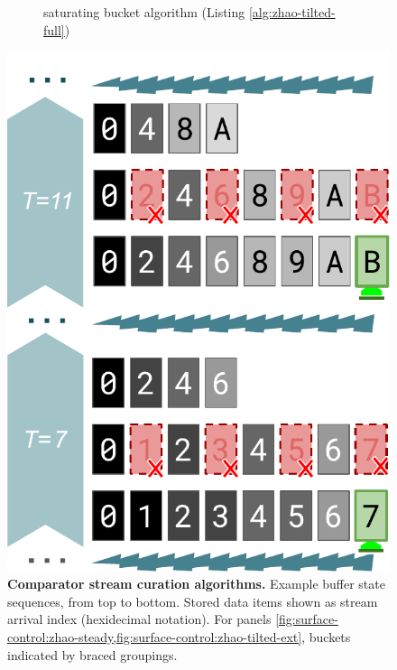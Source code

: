 \begin{figure}
\begin{subfigure}{0.33\linewidth}
\centering
\caption{saturating bucket algorithm (Listing \ref{alg:zhao-tilted-full})}
\label{fig:surface-control-tilted:saturating-bucket}
\end{subfigure}
\begin{minipage}{0.63\linewidth}
\includegraphics[width=\linewidth]{img/surface-control-tilted-naive-doubling}
\end{minipage}

\caption{%
\textbf{Comparator stream curation algorithms.}
\footnotesize
Example buffer state sequences, from top to bottom.
Stored data items shown as stream arrival index (hexidecimal notation).
For panels \cref{fig:surface-control:zhao-steady,fig:surface-control:zhao-tilted-ext}, buckets indicated by braced groupings.
}
\label{fig:surface-control-tilted}

\end{figure}
